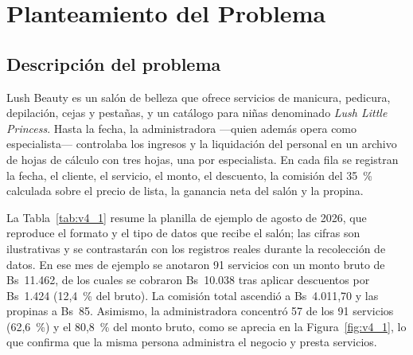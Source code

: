 \section{Planteamiento del Problema}\label{cap:problema}

\subsection{Descripción del problema}

Lush Beauty es un salón de belleza que ofrece servicios de manicura, pedicura, depilación, cejas y pestañas, y un catálogo para niñas denominado \textit{Lush Little Princess}. Hasta la fecha, la administradora —quien además opera como especialista— controlaba los ingresos y la liquidación del personal en un archivo de hojas de cálculo con tres hojas, una por especialista. En cada fila se registran la fecha, el cliente, el servicio, el monto, el descuento, la comisión del 35~\% calculada sobre el precio de lista, la ganancia neta del salón y la propina.


La Tabla~\ref{tab:v4_1} resume la planilla de ejemplo de agosto de 2026, que reproduce el formato y el tipo de datos que recibe el salón; las cifras son ilustrativas y se contrastarán con los registros reales durante la recolección de datos. En ese mes de ejemplo se anotaron 91 servicios con un monto bruto de Bs~11.462, de los cuales se cobraron Bs~10.038 tras aplicar descuentos por Bs~1.424 (12,4~\% del bruto). La comisión total ascendió a Bs~4.011,70 y las propinas a Bs~85. Asimismo, la administradora concentró 57 de los 91 servicios (62,6~\%) y el 80,8~\% del monto bruto, como se aprecia en la Figura~\ref{fig:v4_1}, lo que confirma que la misma persona administra el negocio y presta servicios.



